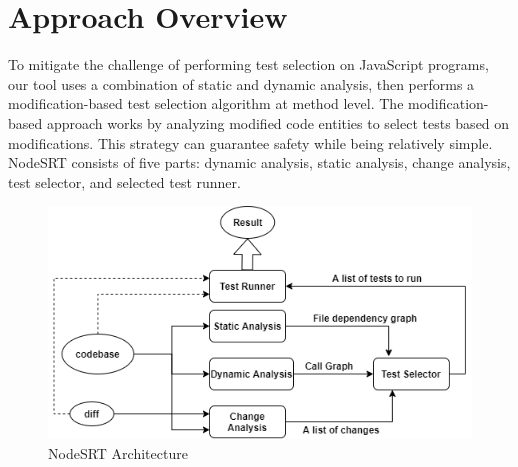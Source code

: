\documentclass[10pt, conference]{IEEEtran}
\begin{document}
\section{Approach Overview}
To mitigate the challenge of performing test selection on JavaScript programs, our tool uses a combination of static and dynamic analysis, then performs a modification-based test 
selection algorithm at method level. The modification-based approach works by analyzing modified code entities 
to select tests based on modifications. This strategy can guarantee safety while being relatively simple. NodeSRT consists of five parts: dynamic analysis, static analysis, change analysis, 
test selector, and selected test runner. 
\begin{figure}[htbp]
    \centerline{\includegraphics[scale=0.45]{NodeSRT Architecture.png}}
    \caption{NodeSRT Architecture}
    \label{fig}
    \end{figure}    
\end{document}
